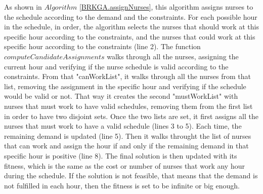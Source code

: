 As shown in $Algorithm$ \ref{BRKGA.assignNurses}, this algorithm assigns nurses to the schedule according to the demand and the constraints. For each possible hour in the schedule, in order, the algorithm selects the nurses that should work at this specific hour according to the constraints, and the nurses that could work at this specific hour according to the constraints (line 2). The function $computeCandidateAssignments$ walks through all the nurses, assigning the current hour and verifying if the nurse schedule is valid according to the constraints. From that "canWorkList", it walks through all the nurses from that list, removing the assignment in the specific hour and verifying if the schedule would be valid or not. That way it creates the second "mustWorkList" with nurses that must work to have valid schedules, removing them from the first list in order to have two disjoint sets. Once the two lists are set, it first assigns all the nurses that must work to have a valid schedule (lines 3 to 5). Each time, the remaining demand is updated (line 5). Then it walks throught the list of nurses that can work and assign the hour if and only if the remaining demand in that specific hour is positive (line 8). The final solution is then updated with its fitness, which is the same as the cost or number of nurses that work any hour during the schedule. If the solution is not feasible, that means that the demand is not fulfilled in each hour, then the fitness is set to be infinite or big enough.

